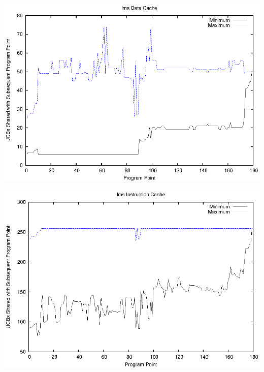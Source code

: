 \begin{center}
  \includegraphics[width=\linewidth]{eps/lms-dcache.eps}
\end{center}

\begin{center}
  \includegraphics[width=\linewidth]{eps/lms-icache.eps}
\end{center}


